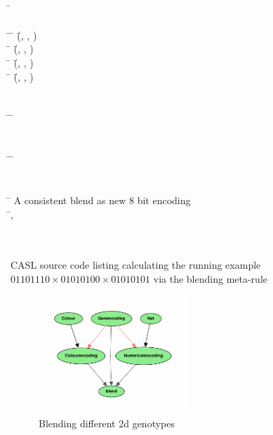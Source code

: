 \documentclass{AISB2008}
\begin{document}
\begin{listing}[H]
{\begin{hetcasl}
\\
\SPEC \= \Ax{=}\\
\> \\
\THEN \=\Ax{\bullet} \= (\=, , ) \Ax{=} \\
\> \Ax{\bullet} \= (\=, , ) \Ax{=} \\
\> \Ax{\bullet} \= (\=, , ) \Ax{=} \\
\> \Ax{\bullet} \= (\=, , ) \Ax{=} \\
\\
\\
\VIEW \= \Ax{:} \=  \\
\\
\\
\VIEW \= \Ax{:} \=  \\
\\
\\
\SPEC \= \Ax{=} \KW{\%} A consistent blend as new 8 bit encoding\\
\>  \=, \\
\AND {}\\
\AND {}\\
\end{hetcasl}
}
\caption{CASL source code listing calculating the running example $01101110\times 01010100\times 01010101$ via the blending meta-rule\label{CASL-listing}}
\end{listing}

\newpage
\begin{figure}[H]
\includegraphics[width=0.5\textwidth]{2dblend.pdf}
\vspace{-.4in}
\caption{Blending different 2d genotypes}
\label{fig:2dblend}
\end{figure}
\vspace{-.2in}
\end{document}
